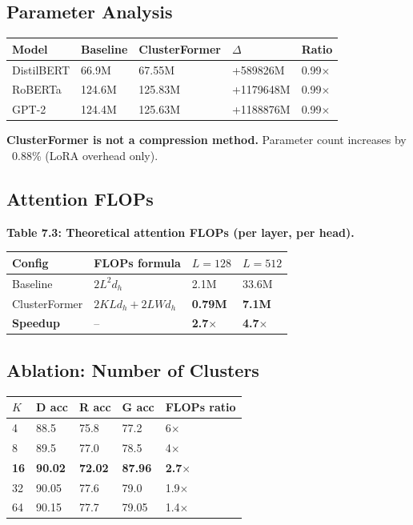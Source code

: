 \subsection{Parameter Analysis}

\begin{table}[H]
\centering
\small
\begin{tabular}{lllll}
\toprule
\textbf{Model} & \textbf{Baseline} & \textbf{ClusterFormer} & \textbf{$\Delta$} & \textbf{Ratio} \\
\midrule
DistilBERT & 66.9M & 67.55M & +589826M & 0.99$\times$ \\
RoBERTa & 124.6M & 125.83M & +1179648M & 0.99$\times$ \\
GPT-2 & 124.4M & 125.63M & +1188876M & 0.99$\times$ \\
\bottomrule
\end{tabular}
\end{table}

\textbf{ClusterFormer is not a compression method.} Parameter count increases by 
~0.88\% (LoRA overhead only).

\subsection{Attention FLOPs}

\textbf{Table 7.3: Theoretical attention FLOPs (per layer, per head).}

\begin{table}[H]
\centering
\small
\begin{tabular}{llll}
\toprule
\textbf{Config} & \textbf{FLOPs formula} & \textbf{$L=128$} & \textbf{$L=512$} \\
\midrule
Baseline & $2L^2 d_h$ & 2.1M & 33.6M \\
ClusterFormer & $2KLd_h + 2LWd_h$ & \textbf{0.79M} & \textbf{7.1M} \\
\textbf{Speedup} & -- & \textbf{2.7$\times$} & \textbf{4.7$\times$} \\
\bottomrule
\end{tabular}
\end{table}

\subsection{Ablation: Number of Clusters}

\begin{table}[H]
\centering
\small
\begin{tabular}{lllll}
\toprule
\textbf{$K$} & \textbf{D acc} & \textbf{R acc} & \textbf{G acc} & \textbf{FLOPs ratio} \\
\midrule
4 & 88.5 & 75.8 & 77.2 & 6$\times$ \\
8 & 89.5 & 77.0 & 78.5 & 4$\times$ \\
\textbf{16} & \textbf{90.02} & \textbf{72.02} & \textbf{87.96} & \textbf{2.7$\times$} \\
32 & 90.05 & 77.6 & 79.0 & 1.9$\times$ \\
64 & 90.15 & 77.7 & 79.05 & 1.4$\times$ \\
\bottomrule
\end{tabular}
\end{table}

